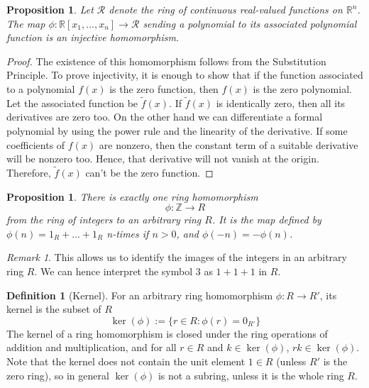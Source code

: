 \documentclass[12pt]{article}
\newtheorem{prop}[thm]{Proposition}
\theoremstyle{definition}
\newtheorem{defn}[thm]{Definition}
\theoremstyle{remark}
\newtheorem{rmk}[thm]{Remark}
\numberwithin{equation}{section}
\newcommand\R{\mathbb R}    %
\newcommand\Z{\mathbb Z}    %
\begin{document}
\begin{prop}
        Let $\mathcal{R}$ denote the ring of continuous real-valued functions on $\R^n$. The map $\phi:\R[x_1,...,x_n]\rightarrow \mathcal{R}$ sending a polynomial to its associated polynomial function is an injective homomorphism.
\end{prop}
\begin{proof}
        The existence of this homomorphism follows from the Substitution Principle. To prove injectivity, it is enough to show that if the function associated to a polynomial $f(x)$ is the zero function, then $f(x)$ is the zero polynomial. Let the associated function be $\widetilde{f}(x)$. If $\widetilde{f}(x)$ is identically zero, then all its derivatives are zero too. On the other hand we can differentiate a formal polynomial by using the power rule and the linearity of the derivative. If some coefficients of $f(x)$ are nonzero, then the constant term of a suitable derivative will be nonzero too. Hence, that derivative will not vanish at the origin. Therefore, $\widetilde{f}(x)$ can't be the zero function.
\end{proof}


\vspace{15pt}

\begin{prop}
        There is exactly one ring homomorphism \begin{equation}
                \phi:\Z\rightarrow R
        \end{equation}
        from the ring of integers to an arbitrary ring $R$. It is the map defined by $\phi(n) = 1_R+...+1_R$ n-times if $n > 0$, and $\phi(-n) = -\phi(n)$.
\end{prop}

\vspace{15pt}

\begin{rmk}
        This allows us to identify the images of the integers in an arbitrary ring $R$. We can hence interpret the symbol $3$ as $1+1+1$ in $R$.
\end{rmk}


\vspace{15pt}


\begin{defn}[Kernel]
        For an arbitrary ring homomorphism $\phi:R\rightarrow R'$, its kernel is the subset of $R$ \begin{equation}
                \ker(\phi):=\{r\in R: \phi(r) = 0_{R'}\}
        \end{equation}
        The kernel of a ring homomorphism is closed under the ring operations of addition and multiplication, and for all $r\in R$ and $k \in \ker(\phi)$, $rk \in \ker(\phi)$. Note that the kernel does not contain the unit element $1 \in R$ (unless $R'$ is the zero ring), so in general $\ker(\phi)$ is not a subring, unless it is the whole ring $R$. 
\end{defn}
\end{document}
